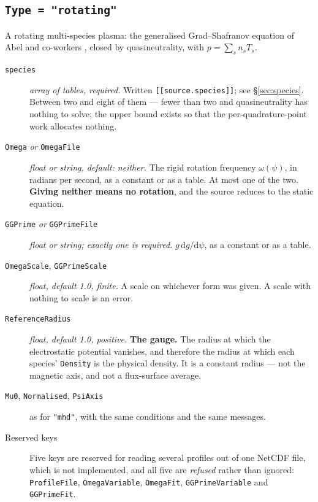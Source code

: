 \subsection{\texttt{Type = "rotating"}}

A rotating multi-species plasma: the generalised Grad--Shafranov equation of
Abel and co-workers \cite{Abel2013}, closed by quasineutrality, with
$p = \sum_s n_s T_s$.

\begin{description}

\item[\texttt{species}] \emph{array of tables, required.} Written
	\texttt{[[source.species]]}; see \S\ref{sec:species}. Between two and eight
	of them --- fewer than two and quasineutrality has nothing to solve; the
	upper bound exists so that the per-quadrature-point work allocates nothing.

\item[\texttt{Omega} \emph{or} \texttt{OmegaFile}] \emph{float or string,
	default: neither.} The rigid rotation frequency $\omega(\psi)$, in radians
	per second, as a constant or as a table. At most one of the two.
	\textbf{Giving neither means no rotation}, and the source reduces to the
	static equation.

\item[\texttt{GGPrime} \emph{or} \texttt{GGPrimeFile}] \emph{float or string;
	exactly one is required.} $g\,\mathrm{d}g/\mathrm{d}\psi$, as a constant or
	as a table.

\item[\texttt{OmegaScale}, \texttt{GGPrimeScale}] \emph{float, default 1.0,
	finite.} A scale on whichever form was given. A scale with nothing to scale
	is an error.

\item[\texttt{ReferenceRadius}] \emph{float, default 1.0, positive.}
	\textbf{The gauge.} The radius at which the electrostatic potential
	vanishes, and therefore the radius at which each species' \texttt{Density}
	is the physical density. It is a constant radius --- not the magnetic axis,
	and not a flux-surface average.

\item[\texttt{Mu0}, \texttt{Normalised}, \texttt{PsiAxis}] as for
	\texttt{"mhd"}, with the same conditions and the same messages.

\item[Reserved keys] Five keys are reserved for reading several profiles out
	of one NetCDF file, which is not implemented, and all five are
	\emph{refused} rather than ignored:
	\texttt{ProfileFile}, \texttt{OmegaVariable}, \texttt{OmegaFit},
	\texttt{GGPrimeVariable} and \texttt{GGPrimeFit}.

\end{description}

